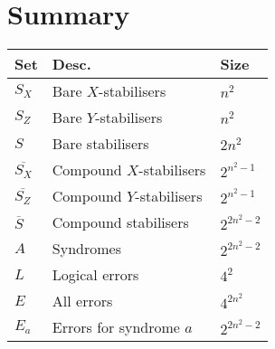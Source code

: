 \section{Summary}
\begin{table}[htb]
  \begin{tabular}{l l l}
    Set & Desc. & Size \\
    \hline
    $S_X$ & Bare $X$-stabilisers  & $n^2$ \\
    $S_Z$ & Bare $Y$-stabilisers  & $n^2$ \\
    $S$   & Bare stabilisers      & $2n^2$ \\
    $\overline{S_X}$ & Compound $X$-stabilisers  & $2^{n^2-1}$ \\
    $\overline{S_Z}$ & Compound $Y$-stabilisers  & $2^{n^2-1}$ \\
    $\overline{S}$   & Compound stabilisers      & $2^{2n^2-2}$ \\
    $A$   & Syndromes & $2^{2n^2-2}$ \\
    $L$   & Logical errors & $4^2$ \\
    $E$   & All errors & $4^{2n^2}$ \\
    $E_a$   & Errors for syndrome $a$ & $2^{2n^2 - 2}$ \\
  \end{tabular}
\end{table}



